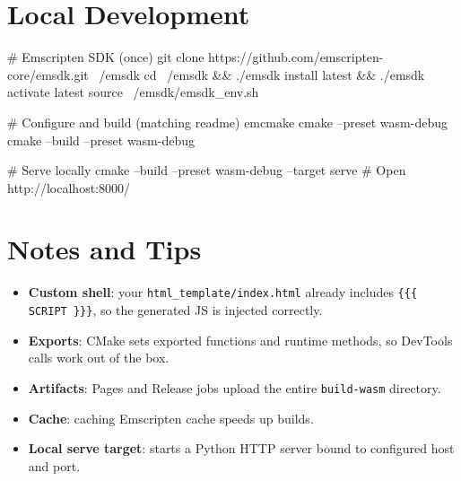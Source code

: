 \documentclass[11pt]{article}
\begin{document}

\section{Local Development}

\begin{bashcode}
# Emscripten SDK (once)
git clone https://github.com/emscripten-core/emsdk.git ~/emsdk
cd ~/emsdk && ./emsdk install latest && ./emsdk activate latest
source ~/emsdk/emsdk_env.sh

# Configure and build (matching readme)
emcmake cmake --preset wasm-debug
cmake --build --preset wasm-debug

# Serve locally
cmake --build --preset wasm-debug --target serve
# Open http://localhost:8000/
\end{bashcode}

\section{Notes and Tips}

\begin{itemize}
  \item \textbf{Custom shell}: your \texttt{html\_template/index.html} already includes \texttt{\{\{\{ SCRIPT \}\}\}}, so the generated JS is injected correctly.
  \item \textbf{Exports}: CMake sets exported functions and runtime methods, so DevTools calls work out of the box.
  \item \textbf{Artifacts}: Pages and Release jobs upload the entire \texttt{build-wasm} directory.
  \item \textbf{Cache}: caching Emscripten cache speeds up builds.
  \item \textbf{Local serve target}: starts a Python HTTP server bound to configured host and port.
\end{itemize}
\end{document}
